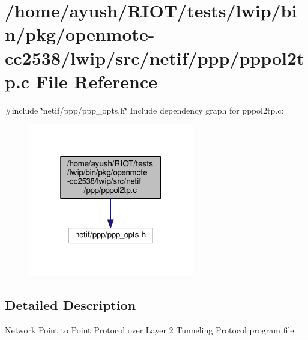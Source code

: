 \hypertarget{openmote-cc2538_2lwip_2src_2netif_2ppp_2pppol2tp_8c}{}\section{/home/ayush/\+R\+I\+O\+T/tests/lwip/bin/pkg/openmote-\/cc2538/lwip/src/netif/ppp/pppol2tp.c File Reference}
\label{openmote-cc2538_2lwip_2src_2netif_2ppp_2pppol2tp_8c}
{\ttfamily \#include \char`\"{}netif/ppp/ppp\+\_\+opts.\+h\char`\"{}}\newline
Include dependency graph for pppol2tp.\+c\+:
\nopagebreak
\begin{figure}[H]
\begin{center}
\leavevmode
\includegraphics[width=205pt]{openmote-cc2538_2lwip_2src_2netif_2ppp_2pppol2tp_8c__incl}
\end{center}
\end{figure}


\subsection{Detailed Description}
Network Point to Point Protocol over Layer 2 Tunneling Protocol program file. 